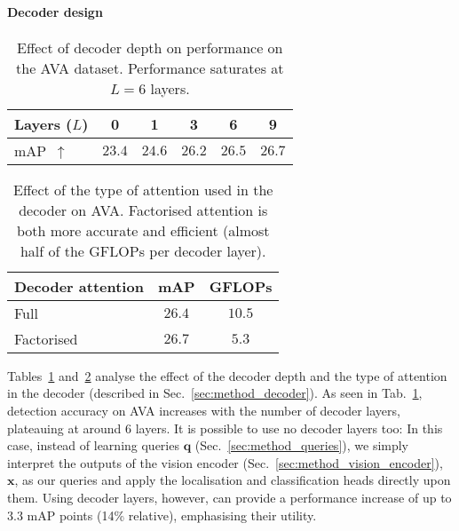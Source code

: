 \documentclass[10pt,twocolumn,letterpaper]{article}
\def \paravspace {-0.7\baselineskip}
\begin{document}
\vspace{\paravspace}
\paragraph{Decoder design}

\begin{table}[t]
\centering
\caption{
	Effect of decoder depth on performance on the AVA dataset. Performance saturates at $L = 6$ layers.
}
\begin{tabular}{lccccc}
\toprule
Layers ($L$) & 0 & 1 & 3 & 6 & 9 \\
\midrule
mAP~$\uparrow$ & $23.4$ & $24.6$ & $26.2$ & $26.5$ &  $\mathbf{26.7}$ \\	
\bottomrule
\end{tabular}
\vspace{-1\baselineskip}
\label{tab:ablation_decoder_layers}

\end{table}


\begin{table}[t]
\vspace{-0.2\baselineskip}
\centering
\caption{Effect of the type of attention used in the decoder on AVA.
	Factorised attention is both more accurate and efficient (almost half of the GFLOPs per decoder layer).}
\begin{tabular}{lcc}
\toprule
Decoder attention & mAP & GFLOPs \\
\midrule
Full & $26.4$ & $10.5$ \\
Factorised & $\mathbf{26.7}$ & $\mathbf{5.3}$  \\
\bottomrule
\end{tabular}
\label{tab:ablation_decoder_attention}
\vspace{-0.5\baselineskip}
\end{table}

 
Tables~\ref{tab:ablation_decoder_layers} and~\ref{tab:ablation_decoder_attention} analyse the effect of the decoder depth and the type of attention in the decoder (described in Sec.~\ref{sec:method_decoder}).
As seen in Tab.~\ref{tab:ablation_decoder_layers}, detection accuracy on AVA increases with the number of decoder layers, plateauing at around 6 layers. It is possible to use no decoder layers too: In this case, instead of learning queries $\mathbf{q}$ (Sec.~\ref{sec:method_queries}), we simply interpret the outputs of the vision encoder (Sec.~\ref{sec:method_vision_encoder}), $\mathbf{x}$, as our queries and apply the localisation and classification heads directly upon them.
Using decoder layers, however, can provide a performance increase of up to 3.3 mAP points (14\% relative), emphasising their utility. 
\end{document}
